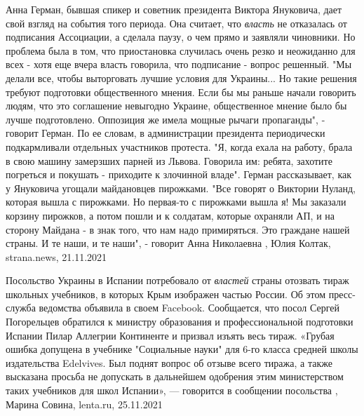 Анна Герман, бывшая спикер и советник президента Виктора Януковича, дает свой
взгляд на события того периода.  Она считает, что \emph{власть} не отказалась
от подписания Ассоциации, а сделала паузу, о чем прямо и заявляли чиновники. Но
проблема была в том, что приостановка случилась очень резко и неожиданно для
всех - хотя еще вчера власть говорила, что подписание - вопрос решенный.  "Мы
делали все, чтобы выторговать лучшие условия для Украины... Но такие решения
требуют подготовки общественного мнения. Если бы  мы раньше начали говорить
людям, что это соглашение невыгодно Украине, общественное мнение было бы лучше
подготовлено. Оппозиция же имела мощные рычаги пропаганды", - говорит Герман.
По ее словам, в администрации президента периодически подкармливали отдельных
участников протеста. "Я, когда ехала на работу, брала в свою машину замерзших
парней из Львова. Говорила им: ребята, захотите погреться и покушать -
приходите к злочинной владе".  Герман рассказывает, как у Януковича угощали
майдановцев пирожками.  "Все говорят о Виктории Нуланд, которая вышла с
пирожками. Но первая-то с пирожками вышла я! Мы заказали корзину пирожков, а
потом пошли и к солдатам, которые охраняли АП, и на сторону Майдана - в знак
того, что нам надо примиряться. Это граждане нашей страны. И те наши, и те
наши", - говорит Анна Николаевна
, 
Юлия Колтак, strana.news, 21.11.2021

Посольство Украины в Испании потребовало от \emph{властей} страны отозвать тираж
школьных учебников, в которых Крым изображен частью России. Об этом
пресс-служба ведомства объявила в своем Facebook. Сообщается, что посол Сергей
Погорельцев обратился к министру образования и профессиональной подготовки
Испании Пилар Аллегрии Континенте и призвал изъять весь тираж. «Грубая ошибка
допущена в учебнике "Социальные науки" для 6-го класса средней школы
издательства Edelvives. Был поднят вопрос об отзыве всего тиража, а также
высказана просьба не допускать в дальнейшем одобрения этим министерством таких
учебников для школ Испании», — говорится в сообщении посольства
, 
Марина Совина, lenta.ru, 25.11.2021
